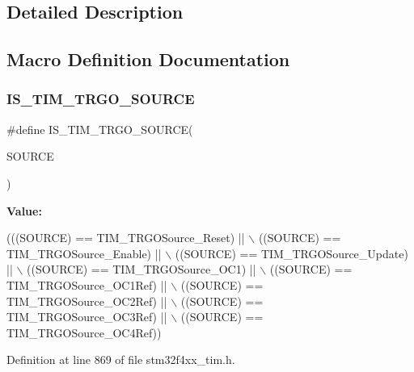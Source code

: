 \subsection{Detailed Description}


\subsection{Macro Definition Documentation}
\mbox{\label{group___t_i_m___trigger___output___source_gadf4e4e0422bd9c108b184884781d2d46}} 
\subsubsection{\texorpdfstring{I\+S\+\_\+\+T\+I\+M\+\_\+\+T\+R\+G\+O\+\_\+\+S\+O\+U\+R\+CE}{IS\_TIM\_TRGO\_SOURCE}}
{\footnotesize\ttfamily \#define I\+S\+\_\+\+T\+I\+M\+\_\+\+T\+R\+G\+O\+\_\+\+S\+O\+U\+R\+CE(\begin{DoxyParamCaption}\item[{}]{S\+O\+U\+R\+CE }\end{DoxyParamCaption})}

{\bfseries Value\+:}
\begin{DoxyCode}
(((SOURCE) == TIM\_TRGOSource\_Reset) || \(\backslash\)
                                    ((SOURCE) == TIM\_TRGOSource\_Enable) || \(\backslash\)
                                    ((SOURCE) == TIM\_TRGOSource\_Update) || \(\backslash\)
                                    ((SOURCE) == TIM\_TRGOSource\_OC1) || \(\backslash\)
                                    ((SOURCE) == TIM\_TRGOSource\_OC1Ref) || \(\backslash\)
                                    ((SOURCE) == TIM\_TRGOSource\_OC2Ref) || \(\backslash\)
                                    ((SOURCE) == TIM\_TRGOSource\_OC3Ref) || \(\backslash\)
                                    ((SOURCE) == TIM\_TRGOSource\_OC4Ref))
\end{DoxyCode}


Definition at line 869 of file stm32f4xx\+\_\+tim.\+h.

